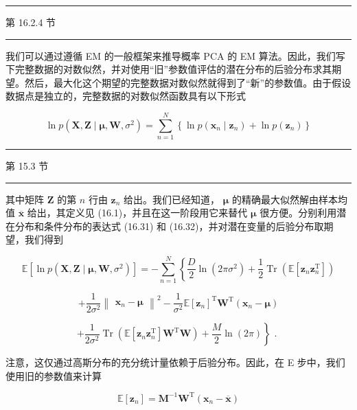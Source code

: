 \documentclass[10pt]{article}
\newcommand{\HRule}{\begin{center}\rule{0.9\linewidth}{0.2mm}\end{center}}
\begin{document}
\HRule

第 16.2.4 节

\HRule

我们可以通过遵循 EM 的一般框架来推导概率 PCA 的 EM 算法。因此，我们写下完整数据的对数似然，并对使用“旧”参数值评估的潜在分布的后验分布求其期望。然后，最大化这个期望的完整数据对数似然就得到了“新”的参数值。由于假设数据点是独立的，完整数据的对数似然函数具有以下形式

\[
\ln p\left( {\mathbf{X},\mathbf{Z} \mid  \mathbf{\mu },\mathbf{W},{\sigma }^{2}}\right)  = \mathop{\sum }\limits_{{n = 1}}^{N}\left\{  {\ln p\left( {{\mathbf{x}}_{n} \mid  {\mathbf{z}}_{n}}\right)  + \ln p\left( {\mathbf{z}}_{n}\right) }\right\}   \tag{16.64}
\]

\HRule

第 15.3 节

\HRule

其中矩阵 \(\mathbf{Z}\) 的第 \(n\) 行由 \({\mathbf{z}}_{n}\) 给出。我们已经知道， \(\mathbf{\mu }\) 的精确最大似然解由样本均值 \(\overline{\mathbf{x}}\) 给出，其定义见 (16.1)，并且在这一阶段用它来替代 \(\mathbf{\mu }\) 很方便。分别利用潜在分布和条件分布的表达式 (16.31) 和 (16.32)，并对潜在变量的后验分布取期望，我们得到

\[
\mathbb{E}\left\lbrack  {\ln p\left( {\mathbf{X},\mathbf{Z} \mid  \mathbf{\mu },\mathbf{W},{\sigma }^{2}}\right) }\right\rbrack   =  - \mathop{\sum }\limits_{{n = 1}}^{N}\left\{  {\frac{D}{2}\ln \left( {{2\pi }{\sigma }^{2}}\right)  + \frac{1}{2}\operatorname{Tr}\left( {\mathbb{E}\left\lbrack  {{\mathbf{z}}_{n}{\mathbf{z}}_{n}^{\mathrm{T}}}\right\rbrack  }\right) }\right.
\]

\[
+ \frac{1}{2{\sigma }^{2}}{\begin{Vmatrix}{\mathbf{x}}_{n} - \mathbf{\mu }\end{Vmatrix}}^{2} - \frac{1}{{\sigma }^{2}}\mathbb{E}{\left\lbrack  {\mathbf{z}}_{n}\right\rbrack  }^{\mathrm{T}}{\mathbf{W}}^{\mathrm{T}}\left( {{\mathbf{x}}_{n} - \mathbf{\mu }}\right)
\]

\[
\left. {+\frac{1}{2{\sigma }^{2}}\operatorname{Tr}\left( {\mathbb{E}\left\lbrack  {{\mathbf{z}}_{n}{\mathbf{z}}_{n}^{\mathrm{T}}}\right\rbrack  {\mathbf{W}}^{\mathrm{T}}\mathbf{W}}\right)  + \frac{M}{2}\ln \left( {2\pi }\right) }\right\}  \text{ . } \tag{16.65}
\]

注意，这仅通过高斯分布的充分统计量依赖于后验分布。因此，在 E 步中，我们使用旧的参数值来计算

\[
\mathbb{E}\left\lbrack  {\mathbf{z}}_{n}\right\rbrack   = {\mathbf{M}}^{-1}{\mathbf{W}}^{\mathrm{T}}\left( {{\mathbf{x}}_{n} - \overline{\mathbf{x}}}\right)  \tag{16.66}
\]
\end{document}
